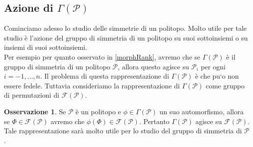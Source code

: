 \documentclass[a4paper,12pt]{report}
\newcommand{\p}{\mathcal{P}}
\theoremstyle{plain}
\theoremstyle{definition}
\newtheorem{oss}[teo]{Osservazione}
\begin{document}
\subsection{Azione di $\Gamma(\p)$}
Cominciamo adesso lo studio delle simmetrie di un politopo. Molto utile per tale studio \`e l'azione del gruppo di simmetria di un politopo su
suoi sottoinsiemi o su insiemi di suoi sottoinsiemi.\\
Per esempio per quanto osservato in \ref{morphRank}, avremo che se $\Gamma(\p)$ \`e il gruppo di simmetria di un politopo $\p$, allora questo
agisce su $\p_i$ per ogni $i=-1,\dots,n$. Il problema di questa rappresentazione di $\Gamma(\p)$ \`e che pu`o non essere fedele. Tuttavia
consideriamo la rappresentazione di $\Gamma(\p)$ come gruppo di permutazioni di $\mathcal{F}(\p)$.
\begin{oss}
Se $\p$ \`e un politopo e $\phi\in\Gamma(\p)$ un suo automorfismo, allora se $\Phi\in\mathcal{F}(\p)$ avremo che $\phi(\Phi)\in\mathcal{F}(\p)$.
Pertanto $\Gamma(\p)$ agisce su $\mathcal{F}(\p)$. Tale rappresentazione sar\`a molto utile per lo studio del gruppo di simmetria di $\p$.
\end{oss}
\end{document}
